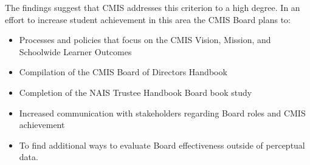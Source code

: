 \begin{findings}
The findings suggest that CMIS addresses this criterion to a high degree. In an effort to increase student achievement in this area the CMIS Board plans to:

\begin{itemize}
\item Processes and policies that focus on the CMIS Vision, Mission, and Schoolwide Learner Outcomes
\item Compilation of the CMIS Board of Directors Handbook
\item Completion of the NAIS Trustee Handbook Board book study
\end{itemize}


\begin{itemize}
\item Increased communication with stakeholders regarding Board roles and CMIS achievement
\end{itemize}


\begin{itemize}
\item To find additional ways to evaluate Board effectiveness outside of perceptual data. 
\end{itemize}
\end{findings}
